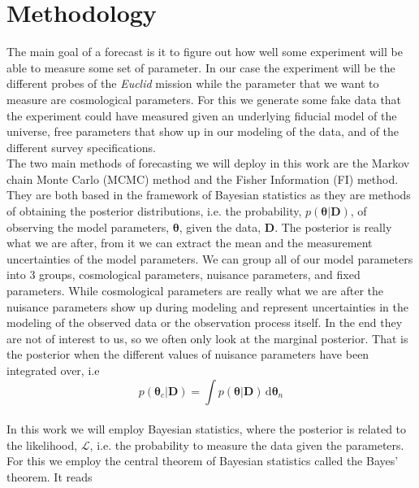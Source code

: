 \documentclass[oneside]{book}
\newcommand*{\Euclid}{\textit{Euclid}\xspace}
\newcommand*{\rd}{\mathrm{d}}
\begin{document}
\chapter{Methodology}
The main goal of a forecast is it to figure out how well some experiment will be able to measure some set of parameter. In our case the experiment will be the different probes of the \Euclid mission while the parameter that we want to measure are cosmological parameters. For this we generate some fake data that the experiment could have measured given an underlying fiducial model of the universe, free parameters that show up in our modeling of the data, and of the different survey specifications.\\
The two main methods of forecasting we will deploy in this work are the Markov chain Monte Carlo (MCMC) method and the Fisher Information (FI) method. They are both based in the framework of Bayesian statistics as they are methods of obtaining the posterior distributions, i.e. the probability, $p(\boldsymbol{\theta}|\boldsymbol{D})$, of observing the model parameters, $\boldsymbol{\theta}$, given the data, $\boldsymbol{D}$. The posterior is really what we are after, from it we can extract the mean and the measurement uncertainties of the model parameters. We can group all of our model parameters into 3 groups, cosmological parameters, nuisance parameters, and fixed parameters. While cosmological parameters are really what we are after the nuisance parameters show up during modeling and represent uncertainties in the modeling of the observed data or the observation process itself. In the end they are not of interest to us, so we often only look at the marginal posterior. That is the posterior when the different values of nuisance parameters have been integrated over, i.e \begin{equation}
    \label{eq:bayes-theorem}
    p(\boldsymbol{\theta}_c|\boldsymbol{D}) = \int p(\boldsymbol{\theta}|\boldsymbol{D})\,\rd \boldsymbol{\theta}_n
\end{equation}\\
In this work we will employ Bayesian statistics, where the posterior is related to the likelihood, $\mathcal{L}$, i.e. the probability to measure the data given the parameters. For this we employ the central theorem of Bayesian statistics called the Bayes' theorem. It reads 
\end{document}
